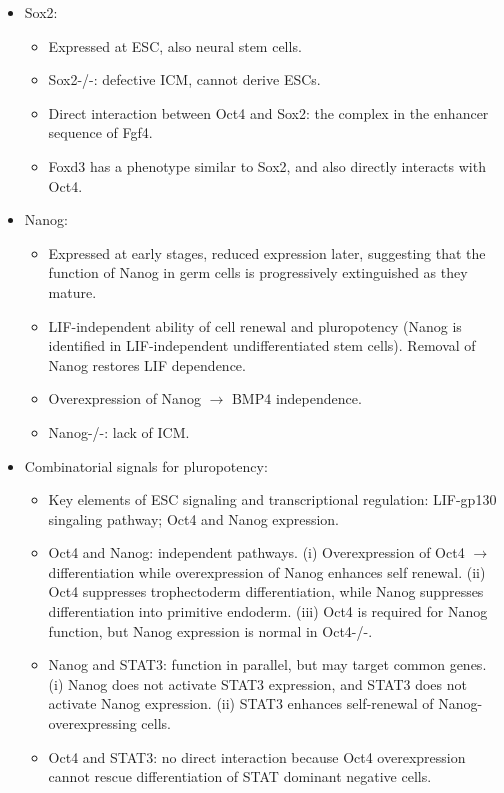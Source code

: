 \documentclass{report}
\begin{document}
\begin{itemize}
\item Sox2: 
\begin{itemize}
	\item Expressed at ESC, also neural stem cells. 
	\item Sox2-/-: defective ICM, cannot derive ESCs. 
	\item Direct interaction between Oct4 and Sox2: the complex in the enhancer sequence of Fgf4. 
	\item Foxd3 has a phenotype similar to Sox2, and also directly interacts with Oct4. 
\end{itemize}
		
\item Nanog: 
\begin{itemize}
	\item Expressed at early stages, reduced expression later, suggesting that the function of Nanog in germ cells is progressively extinguished as they mature. 
	\item LIF-independent ability of cell renewal and pluropotency (Nanog is identified in LIF-independent undifferentiated stem cells). Removal of Nanog restores LIF dependence. 
	\item Overexpression of Nanog $\rightarrow$ BMP4 independence. 
	\item Nanog-/-: lack of ICM. 
\end{itemize}
		
\item Combinatorial signals for pluropotency: 
\begin{itemize}
	\item Key elements of ESC signaling and transcriptional regulation: LIF-gp130 singaling pathway; Oct4 and Nanog expression. 
	\item Oct4 and Nanog: independent pathways. (i) Overexpression of Oct4 $\rightarrow$ differentiation while overexpression of Nanog enhances self renewal. (ii) Oct4 suppresses trophectoderm differentiation, while Nanog suppresses differentiation into primitive endoderm. (iii) Oct4 is required for Nanog function, but Nanog expression is normal in Oct4-/-. 
	\item Nanog and STAT3: function in parallel, but may target common genes. (i) Nanog does not activate STAT3 expression, and STAT3 does not activate Nanog expression. (ii) STAT3 enhances self-renewal of Nanog-overexpressing cells. 
	\item Oct4 and STAT3: no direct interaction because Oct4 overexpression cannot rescue differentiation of STAT dominant negative cells. 
\end{itemize}
\end{itemize}
	
\end{document}
